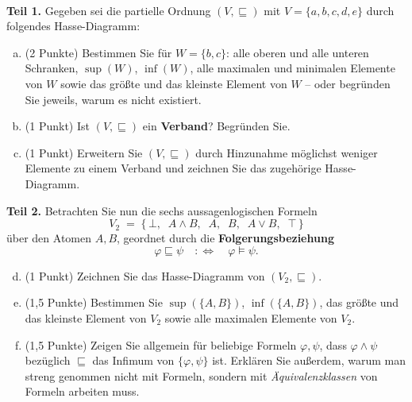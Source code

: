 \\
\textbf{Teil 1.} Gegeben sei die partielle Ordnung $(V,\sqsubseteq)$ mit $V=\{a,b,c,d,e\}$ durch folgendes Hasse-Diagramm:

\begin{center}
\end{center}

\begin{enumerate}[a)]
  \item (2 Punkte) Bestimmen Sie für $W=\{b,c\}$: alle oberen und alle unteren Schranken, $\sup(W)$, $\inf(W)$, alle maximalen und minimalen Elemente von $W$ sowie das größte und das kleinste Element von $W$ -- oder begründen Sie jeweils, warum es nicht existiert.
  \item (1 Punkt) Ist $(V,\sqsubseteq)$ ein \textbf{Verband}? Begründen Sie.
  \item (1 Punkt) Erweitern Sie $(V,\sqsubseteq)$ durch Hinzunahme möglichst weniger Elemente zu einem Verband und zeichnen Sie das zugehörige Hasse-Diagramm.
\end{enumerate}

\medskip
\textbf{Teil 2.} Betrachten Sie nun die sechs aussagenlogischen Formeln
\[
  V_2 \;=\; \{\,\bot,\;\; A\wedge B,\;\; A,\;\; B,\;\; A\vee B,\;\; \top\,\}
\]
über den Atomen $A,B$, geordnet durch die \textbf{Folgerungsbeziehung}
\[
  \varphi \sqsubseteq \psi \quad :\Longleftrightarrow\quad \varphi \models \psi .
\]
\begin{enumerate}[a)]\setcounter{enumi}{3}
  \item (1 Punkt) Zeichnen Sie das Hasse-Diagramm von $(V_2,\sqsubseteq)$.
  \item (1,5 Punkte) Bestimmen Sie $\sup(\{A,B\})$, $\inf(\{A,B\})$, das größte und das kleinste Element von $V_2$ sowie alle maximalen Elemente von $V_2$.
  \item (1,5 Punkte) Zeigen Sie allgemein für beliebige Formeln $\varphi,\psi$, dass $\varphi\wedge\psi$ bezüglich $\sqsubseteq$ das Infimum von $\{\varphi,\psi\}$ ist. Erklären Sie außerdem, warum man streng genommen nicht mit Formeln, sondern mit \emph{Äquivalenzklassen} von Formeln arbeiten muss.
\end{enumerate}

